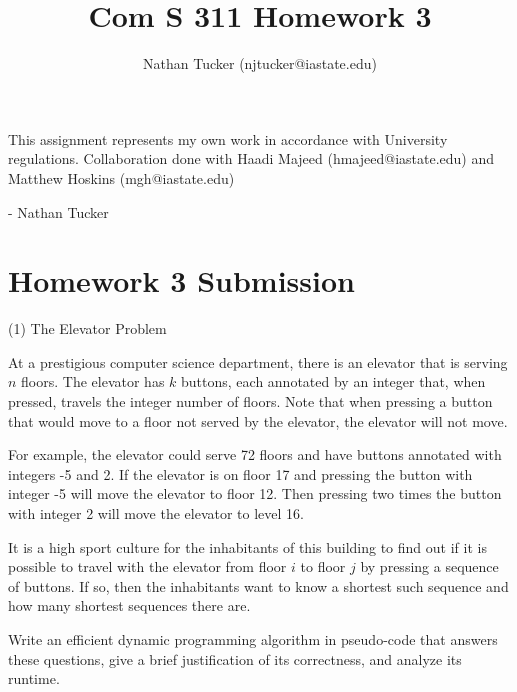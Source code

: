 \documentclass[11pt]{amsart}
\begin{document}
\title{Com S 311 Homework 3}
\author{Nathan Tucker (njtucker@iastate.edu)}
\maketitle

\doublespacing

\vspace{10mm}

\vfill
\begin{flushright}
This assignment represents my own work in accordance with University regulations. Collaboration done with Haadi Majeed (hmajeed@iastate.edu) and Matthew Hoskins (mgh@iastate.edu)

- Nathan Tucker
\end{flushright}
\newpage
\vspace{-.8cm}

\section*{Homework 3 Submission}


(1) The Elevator Problem\medskip

At a prestigious computer science department, there is an elevator that is serving $n$ floors. The elevator has 
$k$ buttons, each annotated by an integer that, when pressed, travels the integer number of floors. Note that 
when pressing a button that would move to a floor not served by the elevator, the elevator will not move.\medskip

For example, the elevator could serve 72 floors and have buttons annotated with integers -5 and 2. If the elevator is on
floor 17 and pressing the button with integer -5 will move the elevator to floor 12. Then pressing two times the button with
integer 2 will move the elevator to level 16.\medskip

It is a high sport culture for the inhabitants of this building to find out if it is possible to travel with the elevator from floor
$i$ to floor $j$ by pressing a sequence of buttons. If so, then the inhabitants want to know a shortest such sequence
and how many shortest sequences there are.\medskip

Write an efficient dynamic programming algorithm in pseudo-code that answers these questions, give a brief justification
of its correctness, and analyze its runtime.\\
\end{document}
